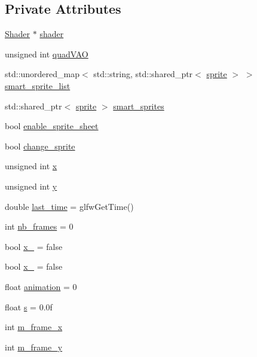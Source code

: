 \subsection*{Private Attributes}
\begin{DoxyCompactItemize}
\item 
\hyperlink{classShader}{Shader} $\ast$ \hyperlink{classSpriteRenderer_a03aa49d90735e23e09f2e0b24da3bd5b}{shader}
\item 
unsigned int \hyperlink{classSpriteRenderer_a4b15d434e41329a5bea98c6ed1167f21}{quad\+V\+AO}
\item 
std\+::unordered\+\_\+map$<$ std\+::string, std\+::shared\+\_\+ptr$<$ \hyperlink{classsprite}{sprite} $>$ $>$ \hyperlink{classSpriteRenderer_ac167a60d32bf39893efe7f3b15df8af2}{smart\+\_\+sprite\+\_\+list}
\item 
std\+::shared\+\_\+ptr$<$ \hyperlink{classsprite}{sprite} $>$ \hyperlink{classSpriteRenderer_a763db8f0194a6e600c1df98a664abd57}{smart\+\_\+sprites}
\item 
bool \hyperlink{classSpriteRenderer_a882741e00a2220718d79b3ee563e94ed}{enable\+\_\+sprite\+\_\+sheet}
\item 
bool \hyperlink{classSpriteRenderer_a9c38d82e567beef27ba6df93b34a3dc7}{change\+\_\+sprite}
\item 
unsigned int \hyperlink{classSpriteRenderer_a448f55e5de2b2b31a641d65e148fb99b}{x}
\item 
unsigned int \hyperlink{classSpriteRenderer_a5a89882a658f79d41eb498055c9ee2ba}{y}
\item 
double \hyperlink{classSpriteRenderer_a1a4ce8c054473e27f1d978f4f884bd19}{last\+\_\+time} = glfw\+Get\+Time()
\item 
int \hyperlink{classSpriteRenderer_a67d2f35b38997c78eb63a92fbc6bcdee}{nb\+\_\+frames} = 0
\item 
bool \hyperlink{classSpriteRenderer_a79a58b0a7a37be0f6a3d014e4529917f}{x\+\_} = false
\item 
bool \hyperlink{classSpriteRenderer_a1f1b9ed16ab7b22808b2ba3e056762cd}{x\+\_} = false
\item 
float \hyperlink{classSpriteRenderer_ab4358a0e1fbfb0e127e54c5289503628}{animation} = 0
\item 
float \hyperlink{classSpriteRenderer_a51d86fab88b20a802abd8e2333f920a7}{s} = 0.\+0f
\item 
int \hyperlink{classSpriteRenderer_ac99efebafb5bac3faac1620d250e0bc0}{m\+\_\+frame\+\_\+x}
\item 
int \hyperlink{classSpriteRenderer_a85e43c28ae6e6934bdbf6719e3c2ce20}{m\+\_\+frame\+\_\+y}
\end{DoxyCompactItemize}


